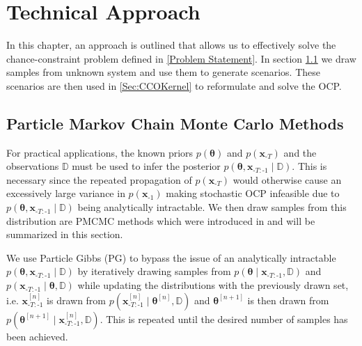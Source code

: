 \chapter{Technical Approach} \label{Technical Approach}

In this chapter, an approach is outlined that allows us to effectively solve the chance-constraint problem defined in \ref{Problem Statement}. In section \ref{PGibbs sampling} we draw samples from unknown system and use them to generate scenarios. These scenarios are then used in \ref{Sec:CCOKernel} to reformulate and solve the OCP.

\section{Particle Markov Chain Monte Carlo Methods} \label{PGibbs sampling}

For practical applications, the known priors $p(\boldsymbol{\theta})$ and $p(\boldsymbol{x}_{\text{-}T})$ and the observations $\mathbb{D}$ must be used to infer the posterior $p(\boldsymbol{\theta}, \boldsymbol{x}_{\text{-}T:\text{-}1}\mid \mathbb{D})$. This is necessary since the repeated propagation of $p(\boldsymbol{x}_{\text{-}T})$ would otherwise cause an excessively large variance in $p(\boldsymbol{x}_{\text{-}1})$ making stochastic OCP infeasible due to $p(\boldsymbol{\theta}, \boldsymbol{x}_{\text{-}T:\text{-}1}\mid \mathbb{D})$ being analytically intractable. We then draw samples from this distribution are PMCMC methods which were introduced in \cite{Andrieu_10} and will be summarized in this section.

We use Particle Gibbs (PG) to bypass the issue of an analytically intractable $p(\boldsymbol{\theta}, \boldsymbol{x}_{\text{-}T:\text{-}1}\mid \mathbb{D})$ by iteratively drawing samples from $p(\boldsymbol{\theta} \mid \boldsymbol{x}_{\text{-}T:\text{-}1}, \mathbb{D})$ and $p(\boldsymbol{x}_{\text{-}T:\text{-}1}\mid \boldsymbol{\theta}, \mathbb{D})$ while updating the distributions with the previously drawn set, i.e. $\boldsymbol{x}_{\text{-}T:\text{-}1}^{[n]}$ is drawn from $p(\boldsymbol{x}_{\text{-}T:\text{-}1}^{[n]}\mid \boldsymbol{\theta}^{[n]}, \mathbb{D})$ and $\boldsymbol{\theta}^{[n+1]}$ is then drawn from $p(\boldsymbol{\theta}^{[n+1]}\mid \boldsymbol{x}_{\text{-}T:\text{-}1}^{[n]}, \mathbb{D})$. This is repeated until the desired number of samples has been achieved.

